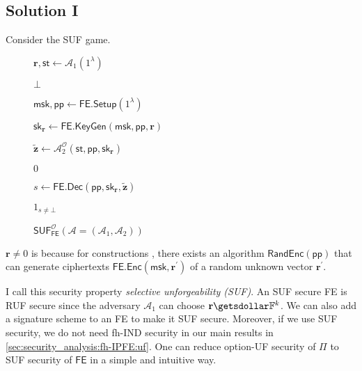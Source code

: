 \subsection{Solution I}
Consider the \textsf{SUF} game.
\begin{figure}[H]
\centering

	\begin{minipage}[t]{0.55\textwidth}
	\begin{algorithm}[H]
	\caption{$\textsf{SUF}^{\mathcal{O}}_{\textsf{FE}}(\mathcal{A} = (\mathcal{A}_1, \mathcal{A}_2))$}
	\begin{algorithmic}[1]
		\State $\mathbf{r}, \textsf{st} \gets \mathcal{A}_1(1^\lambda)$

			\State \Return $\bot$
		\EndIf

		\State $\textsf{msk}, \textsf{pp} \gets \textsf{FE.Setup}(1^\lambda)$

		\State $\textsf{sk}_{\mathbf{r}} \gets \textsf{FE.KeyGen}(\textsf{msk}, \textsf{pp}, \mathbf{r})$

		\State $\mathbf{\tilde{z}} \gets \mathcal{A}_2^{\mathcal{O}} ( \textsf{st}, \textsf{pp}, \textsf{sk}_{\mathbf{r}} )$

			
			\State \Return $0$
		
		\EndIf

		\State $s \gets \textsf{FE.Dec}(\textsf{pp}, \textsf{sk}_{\mathbf{r}}, \mathbf{\tilde{z}} )$

		\State \Return $1_{s \neq \bot}$
	\end{algorithmic}
	\end{algorithm}
	\end{minipage}

\end{figure}

$\mathbf{r} \neq 0$ is because for constructions \cite{10.1007/978-3-319-45871-7_24, cryptoeprint:2016/440}, there exists an algorithm $\textsf{RandEnc}(\textsf{pp})$ that can generate ciphertexts $\textsf{FE.Enc}(\textsf{msk}, \mathbf{r}^\prime)$ of a random unknown vector $\mathbf{r}^\prime$.

I call this security property \emph{selective unforgeability (SUF)}. An SUF secure \textsf{FE} is RUF secure since the adversary $\mathcal{A}_1$ can choose $\mathbf{r} \getsdollar \mathbb{F}^k$. We can also add a signature scheme to an \textsf{FE} to make it SUF secure. Moreover, if we use SUF security, we do not need fh-IND security in our main results in \ref{sec:security_analysis:fh-IPFE:uf}. One can reduce \textsf{option}-UF security of $\Pi$ to SUF security of $\textsf{FE}$ in a simple and intuitive way.

